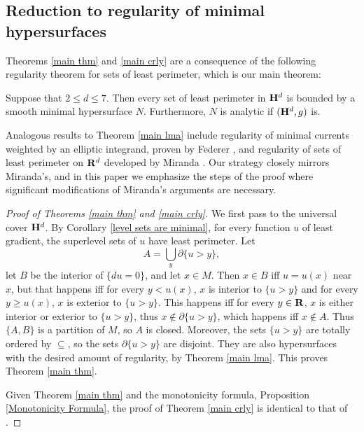 
\subsection{Reduction to regularity of minimal hypersurfaces}

Theorems \ref{main thm} and \ref{main crly} are a consequence of the following regularity theorem for sets of least perimeter, which is our main theorem:

\begin{theorem}\label{main lma}
Suppose that $2 \leq d \leq 7$.
Then every set of least perimeter in $\mathbf H^d$ is bounded by a smooth minimal hypersurface $N$.
Furthermore, $N$ is analytic if $(\mathbf H^d, g)$ is.
\end{theorem}

Analogous results to Theorem \ref{main lma} include regularity of minimal currents weighted by an elliptic integrand, proven by Federer \cite[\S5.3]{federer2014geometric}, and regularity of sets of least perimeter on $\mathbf{R}^d$ developed by Miranda \cite{Miranda64} \cite{Miranda66} \cite{Miranda67}.
Our strategy closely mirrors Miranda's, and in this paper we emphasize the steps of the proof where significant modifications of Miranda's arguments are necessary.

\begin{proof}[Proof of Theorems \ref{main thm} and \ref{main crly}]
We first pass to the universal cover $\mathbf H^d$.
By Corollary \ref{level sets are minimal}, for every function $u$ of least gradient, the superlevel sets of $u$ have least perimeter.
Let
\begin{equation}\label{lamination union}
A = \bigcup_y \partial \{u > y\},
\end{equation}
let $B$ be the interior of $\{du = 0\}$, and let $x \in M$.
Then $x \in B$ iff $u = u(x)$ near $x$, but that happens iff for every $y < u(x)$, $x$ is interior to $\{u > y\}$ and for every $y \geq u(x)$, $x$ is exterior to $\{u > y\}$.
This happens iff for every $y \in \mathbf{R}$, $x$ is either interior or exterior to $\{u > y\}$, thus $x \notin \partial \{u > y\}$, which happens iff $x \notin A$.
Thus $\{A, B\}$ is a partition of $M$, so $A$ is closed.
Moreover, the sets $\{u > y\}$ are totally ordered by $\subseteq$, so the sets $\partial \{u > y\}$ are disjoint.
They are also hypersurfaces with the desired amount of regularity, by Theorem \ref{main lma}.
This proves Theorem \ref{main thm}.

Given Theorem \ref{main thm} and the monotonicity formula, Proposition \ref{Monotonicity Formula}, the proof of Theorem \ref{main crly} is identical to that of \cite[Corollary 3.5]{górny2017planar}.
\end{proof}

